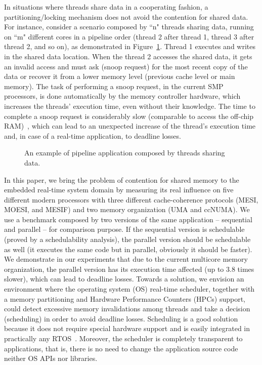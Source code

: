 \documentclass[conference]{IEEEtran}
\newcommand{\fig}[4][ht!]{
  \begin{figure}[#1]
    {\centering{\texttt{[image: fig/\#2]}}\par}
    \caption{#3}
    \label{fig:#2}
  \end{figure}
}
\begin{document}
In situations where threads share data in a cooperating fashion, a partitioning/locking mechanism does not avoid the contention for shared data. For instance, consider a scenario composed by ``n" threads sharing data, running on ``m" different cores in a pipeline order (thread 2 after thread 1, thread 3 after thread 2, and so on), as demonstrated in Figure~\ref{fig:coop_threads}. Thread 1 executes and writes in the shared data location. When the thread 2 accesses the shared data, it gets an invalid access and must ask (snoop request) for the most recent copy of the data or recover it from a lower memory level (previous cache level or main memory). The task of performing a snoop request, in the current SMP processors, is done automatically by the memory controller hardware, which increases the threads' execution time, even without their knowledge. The time to complete a snoop request is considerably slow (comparable to access the off-chip RAM)~\cite{BoydWickizer:10}, which can lead to an unexpected increase of the thread's execution time and, in case of a real-time application, to deadline losses. 

\fig{coop_threads}{An example of pipeline application composed by threads sharing data.}{scale=.6}

In this paper, we bring the problem of contention for shared memory to the embedded real-time system domain by measuring its real influence on five different modern processors with three different cache-coherence protocols (MESI, MOESI, and MESIF) and two memory organization (UMA and ccNUMA). We use a benchmark composed by two versions of the same application -- sequential and parallel -- for comparison purpose. If the sequential version is schedulable (proved by a schedulability analysis), the parallel version should be schedulable as well (it executes the same code but in parallel, obviously it should be faster). We demonstrate in our experiments that due to the current multicore memory organization, the parallel version has its execution time affected (up to 3.8 times slower), which can lead to deadline losses. Towards a solution, we envision an environment where the operating system (OS) real-time scheduler, together with a memory partitioning and Hardware Performance Counters (HPCs) support, could detect excessive memory invalidations among threads and take a decision (scheduling) in order to avoid deadline losses. Scheduling is a good solution because it does not require special hardware support and is easily integrated in practically any RTOS~\cite{Zhuravlev:2010}. Moreover, the scheduler is completely transparent to applications, that is, there is no need to change the application source code neither OS APIs nor libraries.
\end{document}
